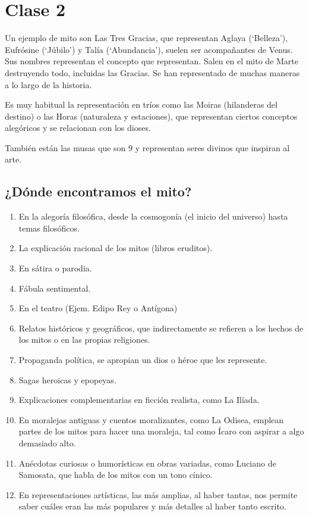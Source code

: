 \chapter{Clase 2}\label{ch:clase2}
Un ejemplo de mito son Las Tres Gracias, que representan Aglaya (‘Belleza’), Eufrósine (‘Júbilo’) y Talía (‘Abundancia’), suelen ser acompañantes de Venus. Sus nombres representan el concepto que representan. Salen en el mito de Marte destruyendo todo, incluidas las Gracias. Se han representado de muchas maneras a lo largo de la historia.

Es muy habitual la representación en tríos como las Moiras (hilanderas del destino) o las Horas (naturaleza y estaciones), que representan ciertos conceptos alegóricos y se relacionan con los dioses.

También están las musas que son 9 y representan seres divinos que inspiran al arte.

\section{¿Dónde encontramos el mito?}
\begin{enumerate}
	\item En la alegoría filosófica, desde la cosmogonía (el inicio del universo) hasta temas filosóficos.
	\item La explicación racional de los mitos (libros eruditos).
	\item En sátira o parodia.
	\item Fábula sentimental.
	\item En el teatro (Ejem. Edipo Rey o Antígona)
	\item Relatos históricos y geográficos, que indirectamente se refieren a los hechos de los mitos o en las propias religiones.
	\item Propaganda política, se apropian un dios o héroe que les represente.
	\item Sagas heroicas y epopeyas.
	\item Explicaciones complementarias en ficción realista, como La Ilíada.
	\item En moralejas antiguas y cuentos moralizantes, como La Odisea, emplean partes de los mitos para hacer una moraleja, tal como Ícaro con aspirar a algo demasiado alto.
	\item Anécdotas curiosas o humorísticas en obras variadas, como Luciano de Samosata, que habla de los mitos con un tono cínico.
	\item En representaciones artísticas, las más amplias, al haber tantas, nos permite saber cuáles eran las más populares y más detalles al haber tanto escrito.
\end{enumerate}

